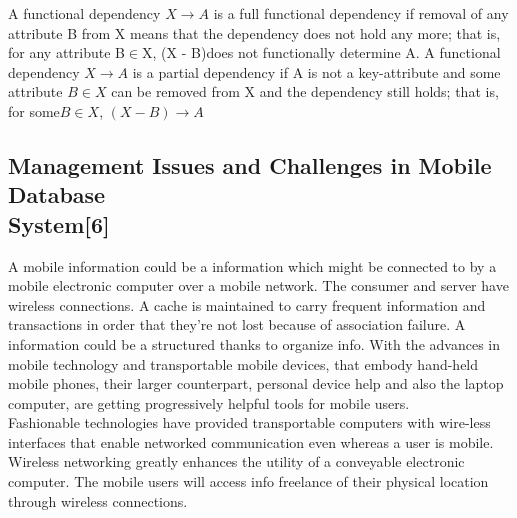 \documentclass[12pt, a4paper]{article}
\begin{document}
\hspace{5mm}A functional dependency \begin{math}
X \rightarrow A\end{math}  is a full functional dependency if removal of any attribute B from X means that the dependency does not hold any more; that is, for any attribute B\begin{math}\in\end{math}X, (X - B)does not functionally determine A. A functional dependency \begin{math}X \rightarrow A  \end{math} is a partial dependency if A is not a key-attribute and some attribute \begin{math} B \in X \end{math}  can be removed from X and the dependency still holds; that is, for some\begin{math} B \in X \end{math},  \begin{math}
(X - B) \rightarrow A\end{math}  

\vspace{5mm}
\subsection{Management Issues and  Challenges in Mobile Database\\ System[6]} 


\vspace{5mm}
A mobile information could be a information which might be connected to by a mobile electronic computer over a mobile network. The consumer and server have wireless connections. A cache is maintained to carry frequent information and transactions in order that they're not lost because of association failure. A information could be a structured thanks to organize info. With the advances in mobile technology and transportable mobile devices, that embody hand-held mobile phones, their larger counterpart, personal device help and also the laptop computer, are getting progressively helpful tools for mobile users.\\

\hspace{5mm}Fashionable technologies have provided transportable computers with wire-less interfaces that enable networked communication even whereas a user is mobile. Wireless networking greatly enhances the utility of a conveyable electronic computer. The mobile users will access info freelance of their physical location through wireless connections.
\end{document}
